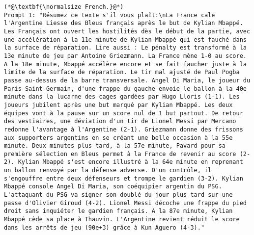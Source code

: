 \begin{lstlisting}[label=lst:judge_summar_instances,caption={Example of prompts for paraphrasing in English and French.}]
(*@\textbf{\normalsize French.}@*)
Prompt 1: "Résumez ce texte s'il vous plaît:\nLa France cale l'Argentine Liesse des Bleus français après le but de Kylian Mbappé. Les Français ont ouvert les hostilités dès le début de la partie, avec une accélération à la 11e minute de Kylian Mbappé qui est fauché dans la surface de réparation. Lire aussi : Le pénalty est transformé à la 13e minute de jeu par Antoine Griezmann. La France mène 1-0 au score. A la 18e minute, Mbappé accélère encore et se fait faucher juste à la limite de la surface de réparation. Le tir mal ajusté de Paul Pogba passe au-dessus de la barre transversale. Angel Di Maria, le joueur du Paris Saint-Germain, d'une frappe du gauche envoie le ballon à la 40e minute dans la lucarne des cages gardées par Hugo Lloris (1-1). Les joueurs jubilent après une but marqué par Kylian Mbappé. Les deux équipes vont à la pause sur un score nul de 1 but partout. De retour des vestiaires, une déviation d'un tir de Lionel Messi par Mercano redonne l'avantage à l'Argentine (2-1). Griezmann donne des frissons aux supporters argentins en se créant une belle occasion à la 55e minute. Deux minutes plus tard, à la 57e minute, Pavard pour sa première sélection en Bleus permet à la France de revenir au score (2-2). Kylian Mbappé s'est encore illustré à la 64e minute en reprenant un ballon renvoyé par la défense adverse. D'un contrôle, il s'engouffre entre deux défenseurs et trompe le gardien (3-2). Kylian Mbappé console Angel Di Maria, son coéquipier argentin du PSG. L'attaquant du PSG va signer son doublé du jour plus tard sur une passe d'Olivier Giroud (4-2). Lionel Messi décoche une frappe du pied droit sans inquiéter le gardien français. A la 87e minute, Kylian Mbappé cède sa place à Thauvin. L'Argentine revient réduit le score dans les arrêts de jeu (90e+3) grâce à Kun Aguero (4-3)."

\end{lstlisting}
